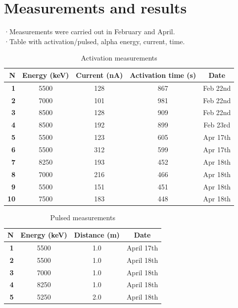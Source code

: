 \documentclass[a4paper,12pt]{report}
\begin{document}
\chapter{Measurements and results}
·Measurements were carried out in February and April.\\
·Table with activation/pulsed, alpha energy, current, time.\\
\begin{table}[h]	%
\centering
\begin{tabular}[c]{>{\bfseries}r||c|c|c|c}
	N & Energy (\unit{\keV}) & Current (\unit{\nano\A}) & Activation time (\unit{\s}) & Date\tablefootnote{All took place in 2023.\label{date_tablefootnote}} \\ \hline
	1	&\num{5500}&\num{128}&\num{867}&Feb 22nd\\ \hline
	2	&\num{7000}&\num{101}&\num{981}&Feb 22nd\\ \hline
	3	&\num{8500}&\num{128}&\num{909}&Feb 22nd\\ \hline
	4	&\num{8500}&\num{192}&\num{899}&Feb 23rd\\ \hline
	5	&\num{5500}&\num{123}&\num{605}&Apr 17th\\ \hline
	6	&\num{5500}&\num{312}&\num{599}&Apr 17th\\ \hline
	7	&\num{8250}&\num{193}&\num{452}&Apr 18th\\ \hline
	8	&\num{7000}&\num{216}&\num{466}&Apr 18th\\ \hline
	9	&\num{5500}&\num{151}&\num{451}&Apr 18th\\ \hline
	10	&\num{7500}&\num{183}&\num{448}&Apr 18th\\ \hline
\end{tabular}
\label{activation_measurements_table}
\caption{Activation measurements}
\end{table}

\begin{table}[h]	%
\centering
\begin{tabular}[c]{>{\bfseries}r||c|c|c}
	N& Energy (\unit{\keV}) & Distance (\unit{\meter}) & Date\footref{date_tablefootnote} \\ \hline	%
	1&\num{5500}&\num{1.0}&April 17th\\ \hline
	2&\num{5500}&\num{1.0}&April 18th\\ \hline
	3&\num{7000}&\num{1.0}&April 18th\\ \hline
	4&\num{8250}&\num{1.0}&April 18th\\ \hline
	5&\num{5250}&\num{2.0}&April 18th\\ \hline
\end{tabular}
\label{pulsed_measurements_table}
\caption{Pulsed measurements}
\end{table}
\end{document}
